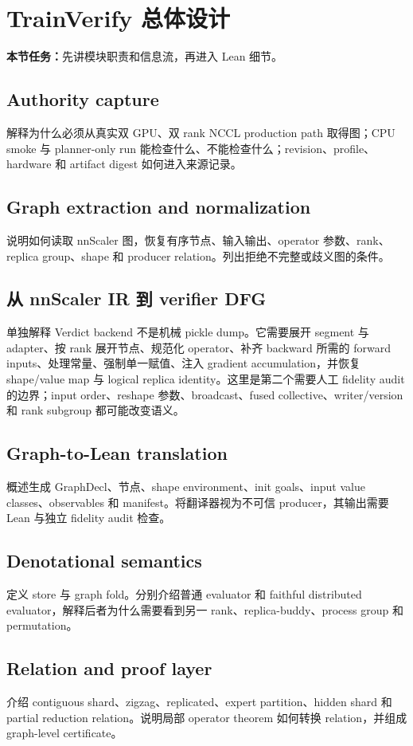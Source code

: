 \documentclass[11pt,a4paper]{ctexart}
\newcommand{\contract}[1]{\par\smallskip\noindent\colorbox{light}{\parbox{0.95\linewidth}{\textbf{本节任务：}#1}}\par\smallskip}
\begin{document}
\section{TrainVerify 总体设计}
\contract{先讲模块职责和信息流，再进入 Lean 细节。}

\subsection{Authority capture}
解释为什么必须从真实双 GPU、双 rank NCCL production path 取得图；CPU smoke 与 planner-only run 能检查什么、不能检查什么；revision、profile、hardware 和 artifact digest 如何进入来源记录。

\subsection{Graph extraction and normalization}
说明如何读取 nnScaler 图，恢复有序节点、输入输出、operator 参数、rank、replica group、shape 和 producer relation。列出拒绝不完整或歧义图的条件。

\subsection{从 nnScaler IR 到 verifier DFG}
单独解释 Verdict backend 不是机械 pickle dump。它需要展开 segment 与 adapter、按 rank 展开节点、规范化 operator、补齐 backward 所需的 forward inputs、处理常量、强制单一赋值、注入 gradient accumulation，并恢复 shape/value map 与 logical replica identity。这里是第二个需要人工 fidelity audit 的边界；input order、reshape 参数、broadcast、fused collective、writer/version 和 rank subgroup 都可能改变语义。

\subsection{Graph-to-Lean translation}
概述生成 GraphDecl、节点、shape environment、init goals、input value classes、observables 和 manifest。将翻译器视为不可信 producer，其输出需要 Lean 与独立 fidelity audit 检查。

\subsection{Denotational semantics}
定义 store 与 graph fold。分别介绍普通 evaluator 和 faithful distributed evaluator，解释后者为什么需要看到另一 rank、replica-buddy、process group 和 permutation。

\subsection{Relation and proof layer}
介绍 contiguous shard、zigzag、replicated、expert partition、hidden shard 和 partial reduction relation。说明局部 operator theorem 如何转换 relation，并组成 graph-level certificate。
\end{document}
